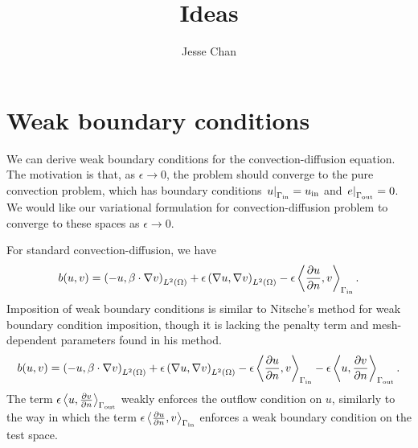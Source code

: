 \documentclass[10pt]{article}
\title{Ideas}
\author{Jesse Chan}
\newcommand{\grad}{\nabla}
\newcommand{\pd}[2]{\frac{\partial#1}{\partial#2}}
\newcommand{\LRp}[1]{\left( #1 \right)}
\newcommand{\LRa}[1]{\left\langle #1 \right\rangle}
\renewcommand{\L}{L^2\LRp{\Omega}}
\begin{document}
\section{Weak boundary conditions}

We can derive weak boundary conditions for the convection-diffusion equation.  The motivation is that, as $\epsilon \rightarrow 0$, the problem should converge to the pure convection problem, which has boundary conditions $\left.u\right|_{\Gamma_{\rm in}} = u_{\rm in}$ and $\left.e\right|_{\Gamma_{\rm out}} = 0$.  We would like our variational formulation for convection-diffusion problem to converge to these spaces as $\epsilon \rightarrow 0$.  

For standard convection-diffusion, we have
\[
b(u,v) = \LRp{-u,\beta\cdot\grad v}_{\L} + \epsilon\LRp{\grad u,\grad v}_{\L} - \epsilon\LRa{\pd{u}{n},v}_{\Gamma_{\rm in}}.
\]
Imposition of weak boundary conditions is similar to Nitsche's method for weak boundary condition imposition, though it is lacking the penalty term and mesh-dependent parameters found in his method.  
\[
b(u,v) = \LRp{-u,\beta\cdot\grad v}_{\L} + \epsilon\LRp{\grad u,\grad v}_{\L} - \epsilon\LRa{\pd{u}{n},v}_{\Gamma_{\rm in}} - \epsilon\LRa{u,\pd{v}{n}}_{\Gamma_{\rm out}}.
\]
The term $\epsilon\LRa{u,\pd{v}{n}}_{\Gamma_{\rm out}}$ weakly enforces the outflow condition on $u$, similarly to the way in which the term $\epsilon\LRa{\pd{u}{n},v}_{\Gamma_{\rm in}}$ enforces a weak boundary condition on the test space.  
\end{document}
